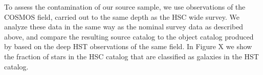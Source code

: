 To assess the contamination of our source sample, we use observations of the 
COSMOS field, carried out to the same depth as the HSC wide survey. We analyze 
these data in the same way as the nominal survey data as described above, and 
compare the resulting source catalog to the object catalog produced by 
\cite{leauthaud07} based on the deep HST observations of the same field.
In Figure X we show the fraction of stars in the HSC catalog that are classified 
as galaxies in the HST catalog.
